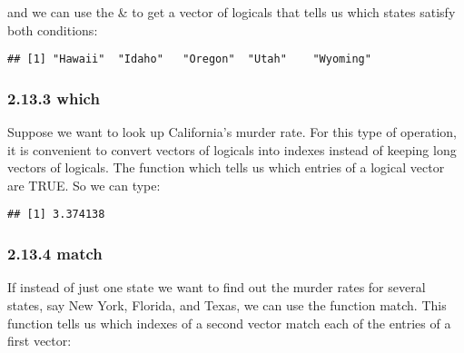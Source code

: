\documentclass[
]{article}
\newenvironment{Shaded}{\begin{snugshade}}{\end{snugshade}}
\newcommand{\FunctionTok}[1]{\textcolor[rgb]{0.00,0.00,0.00}{#1}}
\newcommand{\NormalTok}[1]{#1}
\newcommand{\OtherTok}[1]{\textcolor[rgb]{0.56,0.35,0.01}{#1}}
\newcommand{\SpecialCharTok}[1]{\textcolor[rgb]{0.00,0.00,0.00}{#1}}
\newcommand{\StringTok}[1]{\textcolor[rgb]{0.31,0.60,0.02}{#1}}
\begin{document}
and we can use the \& to get a vector of logicals that tells us which
states satisfy both conditions:

\begin{Shaded}
\end{Shaded}

\begin{verbatim}
## [1] "Hawaii"  "Idaho"   "Oregon"  "Utah"    "Wyoming"
\end{verbatim}

\hypertarget{which}{%
\subsubsection{2.13.3 which}\label{which}}

Suppose we want to look up California's murder rate. For this type of
operation, it is convenient to convert vectors of logicals into indexes
instead of keeping long vectors of logicals. The function which tells us
which entries of a logical vector are TRUE. So we can type:

\begin{Shaded}
\end{Shaded}

\begin{verbatim}
## [1] 3.374138
\end{verbatim}

\hypertarget{match}{%
\subsubsection{2.13.4 match}\label{match}}

If instead of just one state we want to find out the murder rates for
several states, say New York, Florida, and Texas, we can use the
function match. This function tells us which indexes of a second vector
match each of the entries of a first vector:

\begin{Shaded}
\end{Shaded}
\end{document}
